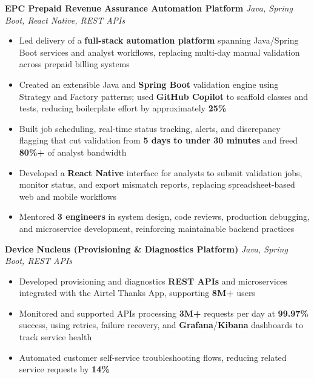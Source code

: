 \documentclass[letterpaper,11pt]{article}
\newcommand{\resumeItem}[1]{
  \item\small{{#1 \vspace{-2pt}}}
}
\newcommand{\resumeItemListStart}{\begin{itemize}}
\newcommand{\resumeItemListEnd}{\end{itemize}\vspace{-5pt}}
\begin{document}
      \vspace{4pt}
      \textbf{\small EPC Prepaid Revenue Assurance Automation Platform} \hfill \textit{\small Java, Spring Boot, React Native, REST APIs} \\
      \vspace{-2pt}
      \resumeItemListStart
        \resumeItem{Led delivery of a \textbf{full-stack automation platform} spanning Java/Spring Boot services and analyst workflows, replacing multi-day manual validation across prepaid billing systems}
        \resumeItem{Created an extensible Java and \textbf{Spring Boot} validation engine using Strategy and Factory patterns; used \textbf{GitHub Copilot} to scaffold classes and tests, reducing boilerplate effort by approximately \textbf{25\%}}
        \resumeItem{Built job scheduling, real-time status tracking, alerts, and discrepancy flagging that cut validation from \textbf{5 days to under 30 minutes} and freed \textbf{80\%+} of analyst bandwidth}
        \resumeItem{Developed a \textbf{React Native} interface for analysts to submit validation jobs, monitor status, and export mismatch reports, replacing spreadsheet-based web and mobile workflows}
        \resumeItem{Mentored \textbf{3 engineers} in system design, code reviews, production debugging, and microservice development, reinforcing maintainable backend practices}
      \resumeItemListEnd

      \vspace{4pt}
      \textbf{\small Device Nucleus (Provisioning \& Diagnostics Platform)} \hfill \textit{\small Java, Spring Boot, REST APIs} \\
      \vspace{-2pt}
      \resumeItemListStart
        \resumeItem{Developed provisioning and diagnostics \textbf{REST APIs} and microservices integrated with the Airtel Thanks App, supporting \textbf{8M+} users}
        \resumeItem{Monitored and supported APIs processing \textbf{3M+} requests per day at \textbf{99.97\%} success, using retries, failure recovery, and \textbf{Grafana}/\textbf{Kibana} dashboards to track service health}
        \resumeItem{Automated customer self-service troubleshooting flows, reducing related service requests by \textbf{14\%}}
      \resumeItemListEnd
\end{document}
